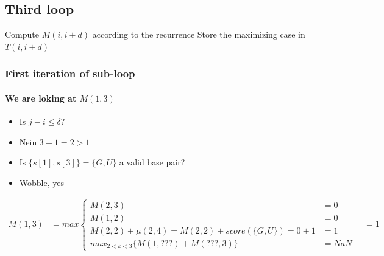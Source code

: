 \subsection*{Third loop}

\begin{algorithmic}
            \State Compute $M(i,i+d)$ according to the recurrence
            \State Store the maximizing case in $T(i,i+d)$
        \EndFor
    \EndFor
\end{algorithmic}

\subsubsection*{First iteration of sub-loop}

\paragraph{We are loking at $M(1,3)$}
\begin{itemize}
    \item[] Is $j-i \leq \delta$?
    \item[$\rightarrow$]  Nein $3-1 = 2 > 1$
    \item[] Is $\{s[1], s[3]\} = \{G, U\}$ a valid base pair?
    \item[$\rightarrow$]  Wobble, yes
\end{itemize}

\begin{align*}
    M(1,3) & = max \begin{cases}
                       M(2,3) & = 0 \\ %
                       M(1,2) & = 0 \\ %
                       M(2,2) + \mu(2,4) = M(2,2) + score(\{G, U\}) = 0 + 1 & = 1 \\ %
                       max_{2 < k < 3} \{ M(1, ???) + M( ???, 3) \} & = NaN
    \end{cases} \quad =  1
\end{align*}


